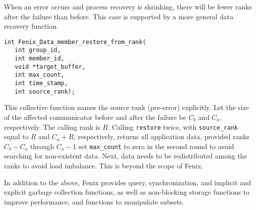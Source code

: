 When an error occurs and process recovery is shrinking, there will be fewer
ranks after the failure than before. This case is supported by a more
general data recovery function.
\begin{verbatim}
int Fenix_Data_member_restore_from_rank(
   int group_id, 
   int member_id, 
   void *target_buffer, 
   int max_count, 
   int time_stamp,
   int source_rank);
\end{verbatim}
This collective function names the source rank (pre-error) explicitly.
Let the size of the affected communicator before and after the failure be $C_b$ and $C_a$,
respectively. The calling rank is $R$.
Calling \texttt{restore} twice, with \texttt{source\_rank} equal to $R$ and
$C_a+R$, respectively, returns all application data, provided ranks
$C_b-C_a$ through $C_a-1$ set \texttt{max\_count} to zero in the second
round to avoid searching for non-existent data.
Next, data needs to be redistributed among the ranks to avoid load imbalance.
This is beyond the scope of Fenix.


In addition to the above, Fenix provides query, synchronization, and
implicit and explicit garbage collection functions, as well as non-blocking  
storage functions to improve performance, and functions to manipulate subsets.
